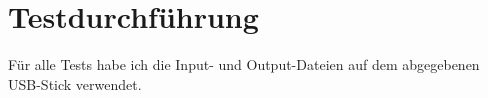 \section{Testdurchführung}
Für alle Tests habe ich die Input- und Output-Dateien auf dem abgegebenen USB-Stick verwendet.



